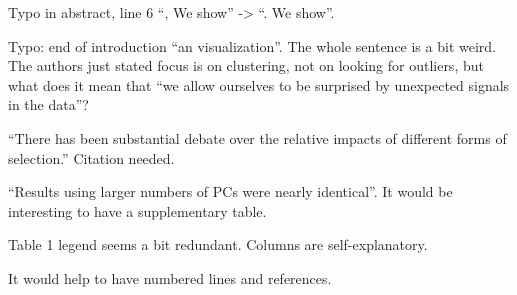 \begin{point}{}
Typo in abstract, line 6 ``, We show'' -> ``. We show''.
\end{point}

\begin{point}{}
Typo: end of introduction ``an visualization''. The whole sentence is a bit weird. The authors just
stated focus is on clustering, not on looking for outliers, but what does it mean that ``we allow
ourselves to be surprised by unexpected signals in the data''?
\end{point}

\begin{point}{}
``There has been substantial debate over the relative impacts of different forms of selection.''
Citation needed.
\end{point}

\begin{point}{}
``Results using larger numbers of PCs were nearly identical''. It would be interesting to have a
supplementary table.
\end{point}

\begin{point}{}
Table 1 legend seems a bit redundant. Columns are self-explanatory.
\end{point}

\begin{point}{}
It would help to have numbered lines and references.
\end{point}

